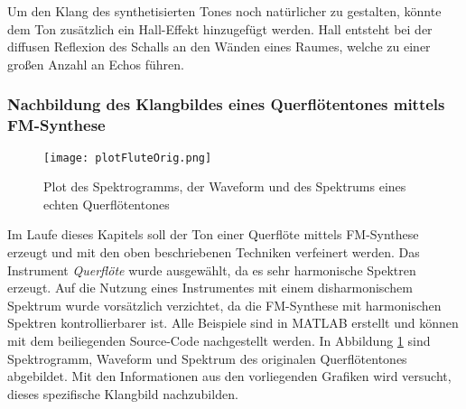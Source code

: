 Um den Klang des synthetisierten Tones noch natürlicher zu gestalten, könnte dem Ton zusätzlich ein Hall-Effekt hinzugefügt werden. Hall entsteht bei der diffusen Reflexion des Schalls an den Wänden eines Raumes, welche zu einer großen Anzahl an Echos führen. \cite[S. 108]{stotz}


\FloatBarrier
\subsubsection{Nachbildung des Klangbildes eines Querflötentones mittels FM-Synthese}

\begin{figure} [h!t!b!]
\centering
  \texttt{[image: plotFluteOrig.png]}
\caption{Plot des Spektrogramms, der Waveform und des Spektrums eines echten Querflötentones}
\label{fig:plotFluteOrig}
\end{figure}

Im Laufe dieses Kapitels soll der Ton einer Querflöte mittels FM-Synthese erzeugt und mit den oben beschriebenen Techniken verfeinert werden. Das Instrument \textit{Querflöte} wurde ausgewählt, da es sehr harmonische Spektren erzeugt. Auf die Nutzung eines Instrumentes mit einem disharmonischem Spektrum wurde vorsätzlich verzichtet, da die FM-Synthese mit harmonischen Spektren kontrollierbarer ist. Alle Beispiele sind in MATLAB erstellt und können mit dem beiliegenden Source-Code nachgestellt werden. In Abbildung \ref{fig:plotFluteOrig} sind Spektrogramm, Waveform und Spektrum des originalen Querflötentones abgebildet. Mit den Informationen aus den vorliegenden Grafiken wird versucht, dieses spezifische Klangbild nachzubilden.

